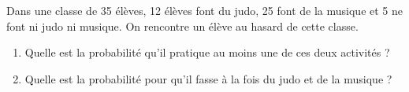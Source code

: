 
Dans une classe de 35 élèves, 12 élèves font du judo, 25 font de la musique et 5 ne font ni judo ni musique. On rencontre un élève au hasard de cette classe.
\begin{enumerate}
\item Quelle est la probabilité qu'il pratique au moins une de ces deux activités ?
\item Quelle est la probabilité pour qu'il fasse à la fois du judo et de la musique ?
\end{enumerate}